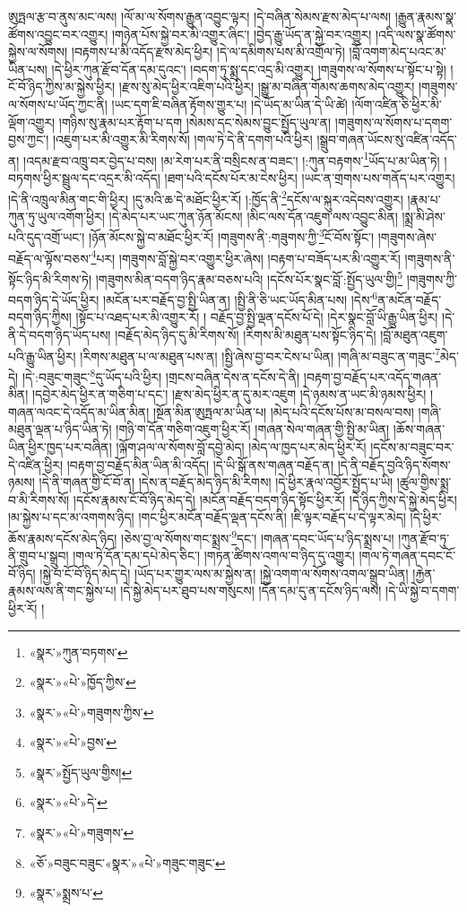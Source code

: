 ཨུཏྤལ་རྩ་བ་ནུས་མང་ལས། །ལོ་མ་ལ་སོགས་རྒྱུན་འབྱུང་ལྟར། །དེ་བཞིན་སེམས་རྫས་མེད་པ་ལས། །རྒྱུན་རྣམས་སྣ་ཚོགས་འབྱུང་བར་འགྱུར། །གཉེན་པོས་སྐྱེ་བར་མི་འགྱུར་ཞིང་། །བྱེད་རྒྱུ་ཡོད་ན་སྐྱེ་བར་འགྱུར། །འདི་ལས་སྣ་ཚོགས་སྐྱེས་ལ་སོགས། །བརྟགས་པ་མི་འདོད་རྫས་མེད་ཕྱིར། །དེ་ལ་དམིགས་པས་མི་འགྲོལ་ཏེ། །བློ་འགག་མེད་པའང་མ་ཡིན་པས། །དེ་ཕྱིར་ཀུན་རྫོབ་དོན་དམ་དུའང་། །བདག་ཏུ་སྨྲ་དང་འདྲ་མི་འགྱུར། །གཟུགས་ལ་སོགས་པ་སྟོང་པ་སྟེ། །ངོ་བོ་ཉིད་ཀྱིས་མ་སྐྱེས་ཕྱིར། །རྫས་སུ་མེད་ཕྱིར་འཇིག་པའི་ཕྱིར། །སྒྱུ་མ་བཞིན་གོམས་ཆགས་མེད་འགྱུར། །གཟུགས་ལ་སོགས་པ་ཡོད་ཀྱང་ནི། །ཡང་དག་ཇི་བཞིན་རྟོགས་གྱུར་པ། །དེ་ཡོད་མ་ཡིན་དེ་ཡི་ཚེ། །ལོག་འཛིན་ཅི་ཕྱིར་མི་ལྡོག་འགྱུར། །གཉིས་སུ་རྣམ་པར་རྟོག་པ་དག །སེམས་དང་སེམས་བྱུང་སྤྱོད་ཡུལ་ན། །གཟུགས་ལ་སོགས་པ་དགག་བྱས་ཀྱང་། །འཇུག་པར་མི་འགྱུར་མི་རིགས་སོ། །གལ་ཏེ་དེ་ནི་དགག་པའི་ཕྱིར། །སྒྲུབ་གཞན་ཡོངས་སུ་འཛིན་འདོད་ན། །འདམ་རྫབ་འཁྲུ་བར་བྱེད་པ་བས། །མ་རེག་པར་ནི་བསྲིངས་ན་བཟང་། །:ཀུན་བརྟགས་\footnote{«སྣར་»ཀུན་བཏགས་}ཡོད་པ་མ་ཡིན་ཏེ། །བཏགས་ཕྱིར་སྦྲུལ་དང་འདྲར་མི་འདོད། །ཐག་པའི་དངོས་པོར་མ་ངེས་ཕྱིར། །ཡང་ན་གྲགས་པས་གནོད་པར་འགྱུར། །དེ་ནི་འཁྲུལ་མིན་གང་གི་ཕྱིར། །དུ་མའི་ཆ་དེ་མཐོང་ཕྱིར་རོ། །:ཁྱོད་ནི་\footnote{«སྣར་»«པེ་»ཁྱོད་ཀྱིས་}དངོས་ལ་སྐུར་འདེབས་འགྱུར། །རྣམ་པ་ཀུན་ཏུ་ཡུལ་འགོག་ཕྱིར། །དེ་མེད་པར་ཡང་ཀུན་ཉོན་མོངས། །མིང་ལས་དོན་འཇུག་ལས་འབྱུང་མིན། །སྨྲ་མི་ཤེས་པའི་དུད་འགྲོ་ཡང་། །ཉོན་མོངས་སྐྱེ་བ་མཐོང་ཕྱིར་རོ། །གཟུགས་ནི་:གཟུགས་ཀྱི་\footnote{«སྣར་»«པེ་»གཟུགས་ཀྱིས་}ངོ་བོས་སྟོང་། །གཟུགས་ཞེས་བརྗོད་ལ་ལྟོས་བཅས་\footnote{«སྣར་»«པེ་»བྱས་}པར། །གཟུགས་བློ་སྐྱེ་བར་འགྱུར་ཕྱིར་ཞེས། །བརྟག་པ་བཟོད་པར་མི་འགྱུར་རོ། །གཟུགས་ནི་སྟོང་ཉིད་མི་རིགས་ཏེ། །གཟུགས་མིན་བདག་ཉིད་རྣམ་བཅས་པའི། །དངོས་པོར་སྣང་བློ་:སྤྱོད་ཡུལ་གྱི།\footnote{«སྣར་»སྤྱོད་ཡུལ་གྱིས།} །གཟུགས་ཀྱི་བདག་ཉིད་དེ་ཡོད་ཕྱིར། །མངོན་པར་བརྗོད་བྱ་སྤྱི་ཡིན་ན། །སྤྱི་ནི་ཅི་ཡང་ཡོད་མིན་པས། །དེས་\footnote{«སྣར་»«པེ་»དེ་}ན་མངོན་བརྗོད་བདག་ཉིད་ཀྱིས། །སྟོང་པ་འཐད་པར་མི་འགྱུར་རོ། །
བརྗོད་བྱ་སྤྱི་ལྡན་དངོས་པོ་དེ། །དེར་སྣང་བློ་ཡི་རྒྱུ་ཡིན་ཕྱིར། །དེ་ནི་དེ་བདག་ཉིད་ཡོད་པས། །བརྗོད་མེད་ཉིད་དུ་མི་རིགས་སོ། །རིགས་མི་མཐུན་པས་སྟོང་ཉིད་དེ། །བློ་མཐུན་འཇུག་པའི་རྒྱུ་ཡིན་ཕྱིར། །རིགས་མཐུན་པ་ལ་མཐུན་པས་ན། །སྤྱི་ཞེས་བྱ་བར་ངེས་པ་ཡིན། །གཞི་མ་བཟུང་ན་གཟུང་\footnote{«སྣར་»«པེ་»གཟུགས་}མེད་དེ། །དེ་:བཟུང་གཟུང་\footnote{«ཅོ་»བཟུང་བཟུང་«སྣར་»«པེ་»གཟུང་གཟུང་}དུ་ཡོད་པའི་ཕྱིར། །གྲངས་བཞིན་དེས་ན་དངོས་དེ་ནི། །བརྟག་བྱ་བརྗོད་པར་འདོད་གཞན་མིན། །དབྱེར་མེད་ཕྱིར་ན་གཅིག་པ་དང་། །རྫས་མེད་ཕྱིར་ན་དུ་མར་འཇུག །དེ་ཉམས་ན་ཡང་མི་ཉམས་ཕྱིར། །གཞན་ལའང་དེ་འདོད་མ་ཡིན་མིན། །སྔོན་མིན་ཨུཏྤལ་མ་ཡིན་པ། །མེད་པའི་དངོས་པོས་མ་བསལ་བས། །གཞི་མཐུན་ལྡན་པ་ཉིད་ཡིན་ཏེ། །གཉི་ག་དོན་གཅིག་འཇུག་ཕྱིར་རོ། །གཞན་སེལ་གཞན་གྱི་སྤྱི་མ་ཡིན། །ཆོས་གཞན་ཡིན་ཕྱིར་ཁྱད་པར་བཞིན། །ལྐོག་ཤལ་ལ་སོགས་བློ་དབྱེ་མེད། །མེད་ལ་ཁྱད་པར་མེད་ཕྱིར་རོ། །དངོས་མ་བཟུང་བར་དེ་འཛིན་ཕྱིར། །བརྟག་བྱ་བརྗོད་མིན་ཡིན་མི་འདོད། །དེ་ཡི་སྒོ་ནས་གཞན་བརྗོད་ན། །དེ་ནི་བརྗོད་བྱའི་ཉིད་སོགས་ཉམས། །དེ་ནི་གཞན་གྱི་ངོ་བོ་ན། །དེས་ན་བརྗོད་མེད་ཉིད་མི་རིགས། །དེ་ཕྱིར་རྣལ་འབྱོར་སྤྱོད་པ་ཡི། །ཚུལ་གྱིས་སྨྲ་བ་མི་རིགས་སོ། །དངོས་རྣམས་ངོ་བོ་ཉིད་མེད་དེ། །མངོན་བརྗོད་བདག་ཉིད་སྟོང་ཕྱིར་རོ། །དེ་ཉིད་ཀྱིས་དེ་སྐྱེ་མེད་ཕྱིར། །མ་སྐྱེས་པ་དང་མ་འགགས་ཉིད། །གང་ཕྱིར་མངོན་བརྗོད་ལྡན་དངོས་ནི། །ཇི་ལྟར་བརྗོད་པ་དེ་ལྟར་མེད། །དེ་ཕྱིར་ཆོས་རྣམས་དངོས་མེད་ཉིད། །ཅེས་བྱ་ལ་སོགས་གང་སྨྲས་\footnote{«སྣར་»སྨྲས་པ་}དང་། །གཞན་དབང་ཡོད་པ་ཉིད་སྨྲས་པ། །ཀུན་རྫོབ་ཏུ་ནི་གྲུབ་པ་སྒྲུབ། །གལ་ཏེ་དོན་དམ་དཔེ་མེད་ཅིང་། །གཏན་ཚིགས་འགལ་བ་ཉིད་དུ་འགྱུར། །གལ་ཏེ་གཞན་དབང་ངོ་བོ་ཉིད། །སྐྱེ་བ་ངོ་བོ་ཉིད་མེད་དེ། །ཡོད་པར་གྱུར་ལས་མ་སྐྱེས་ན། །སྐྱེ་འགག་ལ་སོགས་འགལ་སྒྲུབ་ཡིན། །རྐྱེན་རྣམས་ལས་ནི་གང་སྐྱེས་པ། །དེ་སྐྱེ་མེད་པར་ཐུབ་པས་གསུངས། །དོན་དམ་དུ་ན་དངོས་ཉིད་ལས། །དེ་ཡི་སྐྱེ་བ་དགག་ཕྱིར་རོ། །
